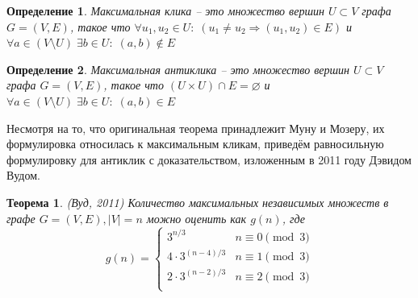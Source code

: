 \documentclass{article}
\newtheorem{definition}{Определение}
\newtheorem{theorem}{Теорема}
\begin{document}
\begin{definition}
    Максимальная клика -- это множество вершин $U\subset V$ графа $G=(V, E)$, такое что $\forall u_1, u_2\in U:\;(u_1\not=u_2 \Rightarrow (u_1, u_2)\in E)$ и
    $\forall a\in (V\setminus U)\;\exists b\in U:\;(a, b)\not\in E$
\end{definition}

\begin{definition}
    Максимальная антиклика -- это множество вершин $U\subset V$ графа $G=(V, E)$, такое что $(U\times U)\cap E=\varnothing$ и
    $\forall a\in (V\setminus U)\;\exists b\in U:\;(a, b)\in E$
\end{definition}

Несмотря на то, что оригинальная теорема принадлежит Муну и Мозеру, их формулировка относилась к максимальным кликам, приведём равносильную формулировку
для антиклик с доказательством, изложенным в 2011 году Дэвидом Вудом\cite{7}.

\begin{theorem} (Вуд, 2011\cite{7}) \newline
\label{theorem:wood}
Количество максимальных независимых множеств в графе $G=(V, E), |V|=n$ можно оценить как $g(n)$, где
\begin{equation*}
g(n) =
\begin{cases}
    3^{n/3} & n\equiv 0 \pmod{3} \\
    4\cdot 3^{(n-4)/3} & n\equiv 1 \pmod{3} \\
    2\cdot 3^{(n-2)/3} & n\equiv 2 \pmod{3} \\
\end{cases}
\end{equation*}
\end{theorem}
\end{document}
